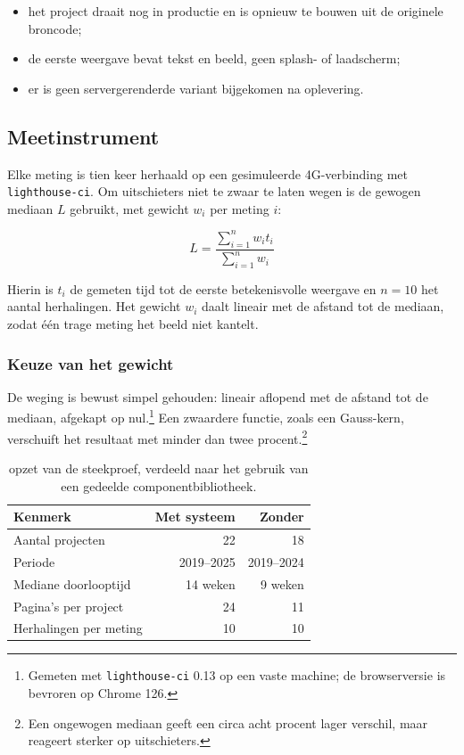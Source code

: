 \documentclass[11pt,a4paper]{article}
\begin{document}
\begin{itemize}
  \item het project draait nog in productie en is opnieuw te bouwen uit de originele broncode;
  \item de eerste weergave bevat tekst en beeld, geen splash- of laadscherm;
  \item er is geen servergerenderde variant bijgekomen na oplevering.
\end{itemize}

\subsection{Meetinstrument}

Elke meting is tien keer herhaald op een gesimuleerde 4G-verbinding met \texttt{lighthouse-ci}. Om uitschieters niet te zwaar te laten wegen is de gewogen mediaan $L$ gebruikt, met gewicht $w_i$ per meting $i$:

\begin{equation}
L = \frac{\sum_{i=1}^{n} w_i t_i}{\sum_{i=1}^{n} w_i}
\label{eq:mediaan}
\end{equation}

Hierin is $t_i$ de gemeten tijd tot de eerste betekenisvolle weergave en $n = 10$ het aantal herhalingen. Het gewicht $w_i$ daalt lineair met de afstand tot de mediaan, zodat één trage meting het beeld niet kantelt.

\subsubsection{Keuze van het gewicht}

De weging is bewust simpel gehouden: lineair aflopend met de afstand tot de mediaan, afgekapt op nul.\footnote{Gemeten met \texttt{lighthouse-ci} 0.13 op een vaste machine; de browserversie is bevroren op Chrome 126.} Een zwaardere functie, zoals een Gauss-kern, verschuift het resultaat met minder dan twee procent.\footnote{Een ongewogen mediaan geeft een circa acht procent lager verschil, maar reageert sterker op uitschieters.}

\begin{table}
\caption{opzet van de steekproef, verdeeld naar het gebruik van een gedeelde componentbibliotheek.}
\label{tab:opzet}
\begin{tabular}{lrr}
\toprule
Kenmerk & Met systeem & Zonder \\
\midrule
Aantal projecten & 22 & 18 \\
Periode & 2019--2025 & 2019--2024 \\
Mediane doorlooptijd & 14 weken & 9 weken \\
Pagina's per project & 24 & 11 \\
Herhalingen per meting & 10 & 10 \\
\bottomrule
\end{tabular}
\end{table}
\end{document}
